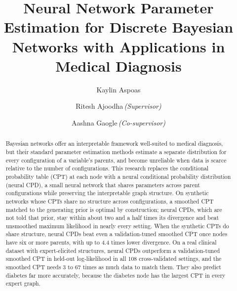\documentclass[a4paper,fleqn]{cas-dc}
\begin{document}
\let\WriteBookmarks\relax

\renewcommand{\textfraction}{.3}
\renewcommand{\topfraction}{.70}
\renewcommand{\bottomfraction}{.50}
\renewcommand{\floatpagefraction}{.60}
\renewcommand{\dbltopfraction}{.60}
\renewcommand{\dblfloatpagefraction}{.60}


\title [mode = title]{Neural Network Parameter Estimation for Discrete Bayesian Networks with Applications in Medical Diagnosis}



\author[1]{Kaylin Aspoas}
\author[1]{Ritesh Ajoodha\texorpdfstring{\,\textnormal{\itshape (Supervisor)}}{ (Supervisor)}}
\author[1]{Aashna Gaogle\texorpdfstring{\,\textnormal{\itshape (Co-supervisor)}}{ (Co-supervisor)}}



\begin{abstract}
Bayesian networks offer an interpretable framework well-suited to medical diagnosis, but their standard parameter estimation methods estimate a separate distribution for every configuration of a variable's parents, and become unreliable when data is scarce relative to the number of configurations. This research replaces the conditional probability table (CPT) at each node with a neural conditional probability distribution (neural CPD), a small neural network that shares parameters across parent configurations while preserving the interpretable graph structure. On synthetic networks whose CPTs share no structure across configurations, a smoothed CPT matched to the generating prior is optimal by construction; neural CPDs, which are not told that prior, stay within about two and a half times its divergence and beat unsmoothed maximum likelihood in nearly every setting. When the synthetic CPTs do share structure, neural CPDs beat even a validation-tuned smoothed CPT once nodes have six or more parents, with up to 4.4 times lower divergence. On a real clinical dataset with expert-elicited structures, neural CPDs outperform a validation-tuned smoothed CPT in held-out log-likelihood in all 108 cross-validated settings, and the smoothed CPT needs 3 to 67 times as much data to match them. They also predict diabetes far more accurately, because the diabetes node has the largest CPT in every expert graph.
\end{abstract}
\end{document}
